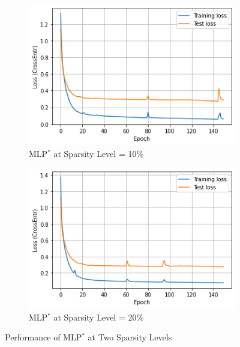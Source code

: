 \documentclass{homework}
\begin{document}
\begin{figure}[h]
\begin{subfigure}{0.5\textwidth}
\includegraphics[width=\linewidth]{mlp_10.png}
\caption{MLP$^*$ at Sparsity Level = 10\%} \label{fig:a}
\end{subfigure}\hspace*{\fill}
\begin{subfigure}{0.5\textwidth}
\includegraphics[width=\linewidth]{mlp_20.png}
\caption{MLP$^*$ at Sparsity Level = 20\%} \label{fig:b}
\end{subfigure}
\caption{Performance of MLP$^*$ at Two Sparsity Levels}
\label{MLP*}
\end{figure}
\end{document}
